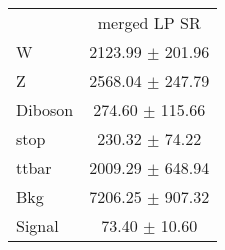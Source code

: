\begin{tabular}{l|c|}
\cline{2-2}
 & \multicolumn{1}{c|}{merged LP SR}\\
W & 2123.99 $\pm$ 201.96\\
Z & 2568.04 $\pm$ 247.79\\
Diboson & 274.60 $\pm$ 115.66\\
stop & 230.32 $\pm$ 74.22\\
ttbar & 2009.29 $\pm$ 648.94\\
\hline
Bkg & 7206.25 $\pm$ 907.32\\
\hline
Signal & 73.40 $\pm$ 10.60\\
\end{tabular}
